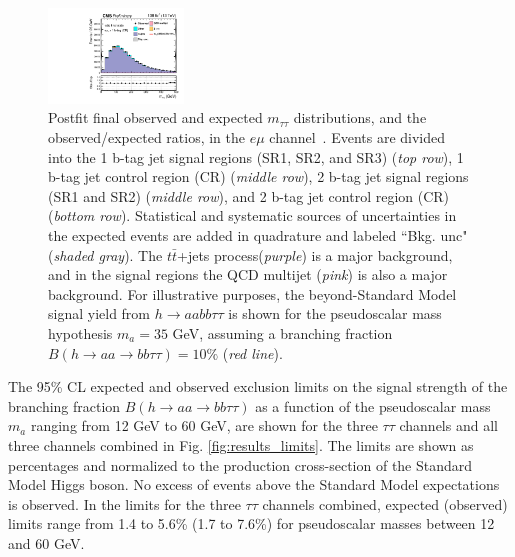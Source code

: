 \begin{figure}[ht]
\begin{center}
        \includegraphics[width=0.32\textwidth]{figures/ch-10-results/em_all_7_post_prelim-yes.pdf}
    \end{center}
    \caption[Postfit final observed and expected $m_{\tau\tau}$ distributions in the $e\mu$ channel.]{Postfit final observed and expected $m_{\tau\tau}$ distributions, and the observed/expected ratios, in the $e\mu$ channel~\cite{CMS-AN-20-213}. Events are divided into the 1 b-tag jet signal regions (SR1, SR2, and SR3) (\textit{top row}), 1 b-tag jet control region (CR) (\textit{middle row}), 2 b-tag jet signal regions (SR1 and SR2) (\textit{middle row}), and 2 b-tag jet control region (CR) (\textit{bottom row}). Statistical and systematic sources of uncertainties in the expected events are added in quadrature and labeled ``Bkg. unc" (\textit{shaded gray}). The $t\bar{t}$+jets process(\textit{purple}) is a major background, and in the signal regions the QCD multijet (\textit{pink}) is also a major background. For illustrative purposes, the beyond-Standard Model signal yield from $h\rightarrow aa bb\tau\tau$ is shown for the pseudoscalar mass hypothesis $m_a = 35$ GeV, assuming a branching fraction $B(h \rightarrow aa \rightarrow bb\tau\tau) = 10\%$ (\textit{red line}).}
    \label{fig:results_mtt_postfit_emall}
\end{figure}


The 95\% CL expected and observed exclusion limits on the signal strength of the branching fraction $B(h \rightarrow aa \rightarrow bb\tau\tau)$ as a function of the pseudoscalar mass $m_a$ ranging from 12 GeV to 60 GeV, are shown for the three $\tau\tau$ channels and all three channels combined in Fig. \ref{fig:results_limits}. The limits are shown as percentages and normalized to the production cross-section of the Standard Model Higgs boson. No excess of events above the Standard Model expectations is observed. In the limits for the three $\tau\tau$ channels combined, expected (observed) limits range from 1.4 to 5.6\% (1.7 to 7.6\%) for pseudoscalar masses between 12 and 60 GeV.


